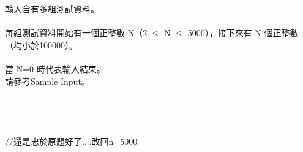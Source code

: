 輸入含有多組測試資料。\\
\\
每組測試資料開始有一個正整數 N（2 $\leq$ N $\leq$ 5000），接下來有 N 個正整數（均小於100000）。\\
\\
當 N=0 時代表輸入結束。\\
請參考Sample Input。\\
\\
\\
\\
\\
//還是忠於原題好了....改回n=5000